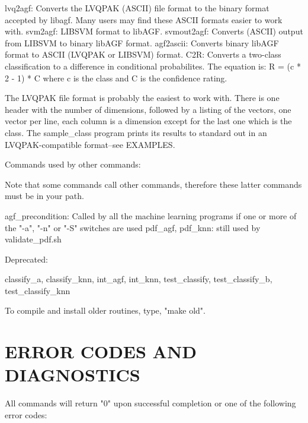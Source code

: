 \documentclass[12pt]{article}
\begin{document}
  lvq2agf:	Converts the LVQPAK (ASCII) file format to the binary format accepted by libagf.  Many users may find these ASCII formats easier to work with.
  svm2agf:	LIBSVM format to libAGF.
  svmout2agf:	Converts (ASCII) output from LIBSVM to binary libAGF format.
  agf2ascii:	Converts binary libAGF format to ASCII (LVQPAK or LIBSVM)  format.
  C2R:		Converts a two-class classification to a difference in conditional probabilites.
		The equation is:
			R = (c * 2 - 1) * C
		where c is the class and C is the confidence rating.

  The LVQPAK file format is probably the easiest to work with.  There is one header with the number of dimensions, followed by a listing of the vectors, one vector per line, each column is a dimension except for the last one which is the class.  The sample_class program prints its results to standard out in an LVQPAK-compatible format--see EXAMPLES.

Commands used by other commands:

  Note that some commands call other commands, therefore these latter commands must be in your path.

  agf_precondition: Called by all the machine learning programs if one or more of the "-a", "-n" or "-S" switches are used
  pdf_agf, pdf_knn: still used by validate_pdf.sh

Deprecated:

  classify_a, classify_knn, int_agf, int_knn, test_classify, test_classify_b,  test_classify_knn

  To compile and install older routines, type, "make old".


\section{ERROR CODES AND DIAGNOSTICS}

  All commands will return "0" upon successful completion or one of the following error codes:
\end{document}
